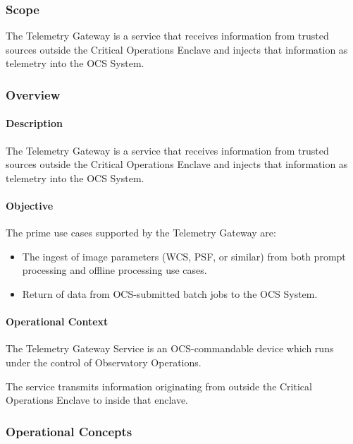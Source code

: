 \subsubsection{Scope}

The Telemetry Gateway is a service that receives information from
trusted sources outside the Critical Operations Enclave and injects
that information as telemetry into the OCS System.

\subsubsection{Overview}

\paragraph{Description}

The Telemetry Gateway is a service that receives information from
trusted sources outside the Critical Operations Enclave and injects
that information as telemetry into the OCS System.

\paragraph{Objective}

The prime use cases supported by the Telemetry Gateway are:

\begin{itemize}
\item The ingest of image parameters (WCS, PSF, or similar) from both prompt
processing and offline processing use cases.
\item Return of data from OCS-submitted batch jobs to the OCS System.
\end{itemize}

\paragraph{Operational Context}

The Telemetry Gateway Service is an OCS-commandable device which runs
under the control of Observatory Operations.

The service transmits information originating from outside the Critical Operations
Enclave to inside that enclave.

\subsubsection{Operational Concepts}

